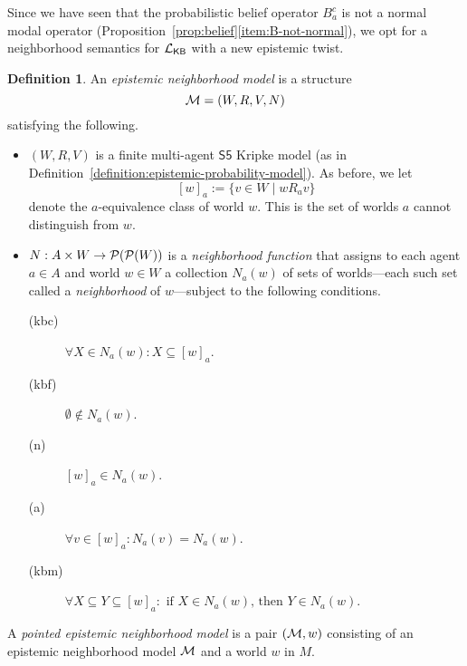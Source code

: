 \documentclass[12pt]{article}
\newcommand{\XXXcomment}[1]{}
\newcommand{\XXXcomment}[1]{\marginpar{\color{blue}{\footnotesize #1}}}
\theoremstyle{definition}
\newtheorem{definition}[theorem]{Definition}
\newcommand{\pow}{{\cal P}}    %
\newcommand{\M}{{\cal M}}      %
\newcommand{\Lang}{{\cal L}}   %
\newcommand{\KB}{{\mathsf{KB}}}                        %
\begin{document}
Since we have seen that the probabilistic belief operator $B_a^c$ is
not a normal modal operator (Proposition~\ref{prop:belief}\eqref{item:B-not-normal}), we opt
for a neighborhood semantics for $\Lang_\KB$ \cite[Ch.~7]{Chellas:ml}
with a new epistemic twist.

\XXXcomment{BR: changed name of some EPM properties.  This is because
  I changed the name of some schemes (in Table~\ref{table:KB}) because
  they conflict with names from Chellas.  Essentially, I added extra
  letters to resolve the conflicts.  Please see Table~\ref{table:KB}
  on page~\pageref{table:KB} first and let me know what you think of
  the new suggested names.}

\begin{definition} 
  An \emph{epistemic neighborhood model} is a structure
  \[
  \M=(W,R,V,N)
  \]
  satisfying the following.
  \begin{itemize}
  \item $(W,R,V)$ is a finite multi-agent $\mathsf{S5}$ Kripke model
    (as in Definition~\ref{definition:epistemic-probability-model}).
    As before, we let 
    \[
    [w]_a:=\{v\in W\mid wR_av\}
    \]
    denote the $a$-equivalence class of world $w$.  This is the
    set of worlds $a$ cannot distinguish from $w$.

  \item $N : A\times W \to \pow(\pow(W))$ is a \emph{neighborhood
      function} that assigns to each agent $a\in A$ and world $w\in W$
    a collection $N_a(w)$ of sets of worlds---each such set called a
    \emph{neighborhood} of $w$---subject to the following conditions.
    \begin{description}
    \item[(kbc)] $\forall X \in N_a(w) : X \subseteq [w]_a$.

    \item[(kbf)] $\emptyset\notin N_a(w)$.
      
    \item[(n)] $[w]_a\in N_a(w)$.
      
    \item[(a)] $\forall v \in [w]_a : N_a(v) = N_a(w)$.

    \item[(kbm)] $\forall X \subseteq Y \subseteq [w]_a : 
      \text{ if } X \in N_a(w) \text{, then } Y \in N_a(w)$.
   \end{description}
  \end{itemize}
  A \emph{pointed epistemic neighborhood model} is a pair $(\M,w)$
  consisting of an epistemic neighborhood model $\M$ and a world $w$
  in $M$. 
\end{definition}
\end{document}
